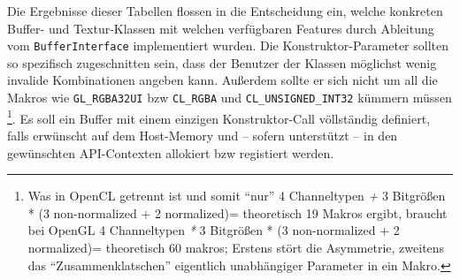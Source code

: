 	Die Ergebnisse dieser Tabellen flossen in die Entscheidung ein, welche konkreten Buffer-
	und Textur-Klassen mit welchen  verfügbaren Features durch Ableitung vom
	\lstinline|BufferInterface| implementiert wurden. Die Konstruktor-Parameter sollten
	so spezifisch zugeschnitten sein, dass der Benutzer der Klassen möglichst wenig invalide
	Kombinationen angeben kann. Außerdem sollte er sich nicht um all die Makros
	wie \lstinline|GL_RGBA32UI| bzw \lstinline|CL_RGBA| und \lstinline|CL_UNSIGNED_INT32|
	kümmern müssen 
	\footnote{Was in OpenCL getrennt ist und somit "`nur"' 
		4 Channeltypen \emph{+} 3 Bitgrößen * (3 non-normalized + 2 normalized)= theoretisch 19 Makros ergibt,
		braucht bei OpenGL
			4 Channeltypen \emph{*} 3 Bitgrößen * (3 non-normalized + 2 normalized)= theoretisch 60 makros;
			Erstens stört die Asymmetrie, zweitens das "`Zusammenklatschen"' eigentlich unabhängiger Parameter in ein 
			Makro.}. 
	Es soll ein Buffer mit einem einzigen Konstruktor-Call völlständig definiert,
	falls erwünscht auf dem Host-Memory und -- sofern unterstützt --
	in den gewünschten API-Contexten allokiert bzw registiert werden.
	
